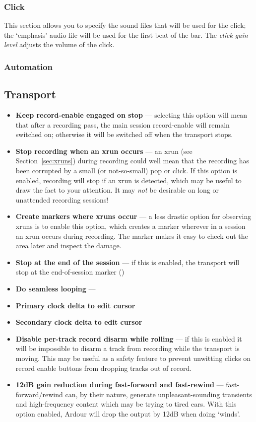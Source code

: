 \documentclass[10pt,a4paper]{book}
\newcommand{\todo}[1]{\marginpar{\small\texttt{#1}}}
\begin{document}
\subsubsection{Click}

This section allows you to specify the sound files that will be used
for the click; the `emphasis' audio file will be used for the first
beat of the bar.  The \emph{click gain level} adjusts the volume of
the click.

\subsubsection{Automation}


\subsection{Transport}

\begin{itemize}
\item \textbf{Keep record-enable engaged on stop} --- selecting this
  option will mean that after a recording pass, the main session
  record-enable will remain switched on; otherwise it will be switched
  off when the transport stops.
\item \textbf{Stop recording when an xrun occurs} --- an xrun (see
  Section~\ref{sec:xruns}) during recording could well mean that the
  recording has been corrupted by a small (or not-so-small) pop or
  click.  If this option is enabled, recording will stop if an xrun is
  detected, which may be useful to draw the fact to your attention.
  It may \emph{not} be desirable on long or unattended recording
  sessions!
\item \textbf{Create markers where xruns occur} --- a less drastic
  option for observing xruns is to enable this option, which creates a
  marker wherever in a session an xrun occurs during recording.  The
  marker makes it easy to check out the area later and inspect the
  damage.
\item \textbf{Stop at the end of the session} --- if this is enabled,
  the transport will stop at the end-of-session marker (\todo{does it
    stop during record too?})
\item \textbf{Do seamless looping} --- \todo{hmm!}
\item \textbf{Primary clock delta to edit cursor}
\item \textbf{Secondary clock delta to edit cursor}
\item \textbf{Disable per-track record disarm while rolling} --- if
  this is enabled it will be impossible to disarm a track from
  recording while the transport is moving.  This may be useful as a
  safety feature to prevent unwitting clicks on record enable buttons
  from dropping tracks out of record.
\item \textbf{12dB gain reduction during fast-forward and fast-rewind}
  --- fast-forward/rewind can, by their nature, generate
  unpleasant-sounding transients and high-frequency content which may
  be trying to tired ears.  With this option enabled, Ardour will drop
  the output by 12dB when doing `winds'.
\end{itemize}
\end{document}

